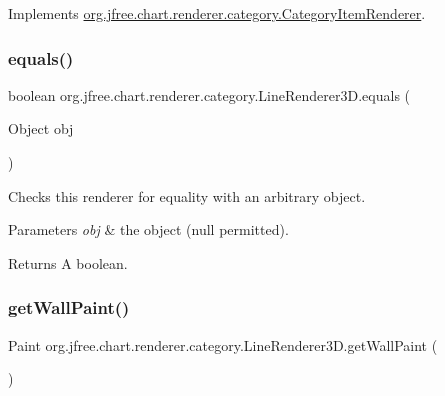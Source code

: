 Implements \mbox{\hyperlink{interfaceorg_1_1jfree_1_1chart_1_1renderer_1_1category_1_1_category_item_renderer_a5dae81a98a7bfe3e3c68bef3d8e7b225}{org.\+jfree.\+chart.\+renderer.\+category.\+Category\+Item\+Renderer}}.

\mbox{\label{classorg_1_1jfree_1_1chart_1_1renderer_1_1category_1_1_line_renderer3_d_a8b15ede2ead8cf9d2f78ddb9dda4a34e}} 
\subsubsection{\texorpdfstring{equals()}{equals()}}
{\footnotesize\ttfamily boolean org.\+jfree.\+chart.\+renderer.\+category.\+Line\+Renderer3\+D.\+equals (\begin{DoxyParamCaption}\item[{Object}]{obj }\end{DoxyParamCaption})}

Checks this renderer for equality with an arbitrary object.


\begin{DoxyParams}{Parameters}
{\em obj} & the object ({\ttfamily null} permitted).\\
\hline
\end{DoxyParams}
\begin{DoxyReturn}{Returns}
A boolean. 
\end{DoxyReturn}
\mbox{\label{classorg_1_1jfree_1_1chart_1_1renderer_1_1category_1_1_line_renderer3_d_a3e748bdcb67c8caf5ff6ffec78b88f10}} 
\subsubsection{\texorpdfstring{get\+Wall\+Paint()}{getWallPaint()}}
{\footnotesize\ttfamily Paint org.\+jfree.\+chart.\+renderer.\+category.\+Line\+Renderer3\+D.\+get\+Wall\+Paint (\begin{DoxyParamCaption}{ }\end{DoxyParamCaption})}


